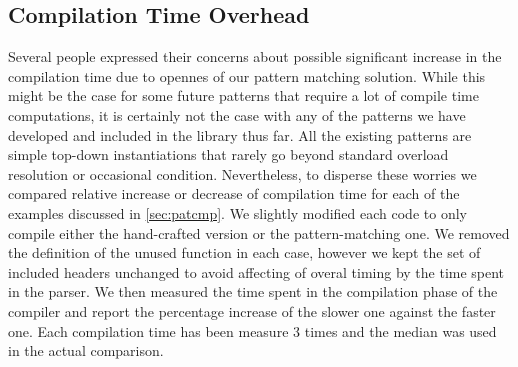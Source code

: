 \subsection{Compilation Time Overhead}
\label{sec:ctcmp}

Several people expressed their concerns about possible significant increase in 
the compilation time due to opennes of our pattern matching solution. While this 
might be the case for some future patterns that require a lot of compile time 
computations, it is certainly not the case with any of the patterns we have 
developed and included in the library thus far. All the existing patterns are 
simple top-down instantiations that rarely go beyond standard overload 
resolution or occasional  condition. Nevertheless, to 
disperse these worries we compared relative increase or decrease of compilation 
time for each of the examples discussed in \textsection\ref{sec:patcmp}. 
We slightly modified each code to only compile either the hand-crafted version 
or the pattern-matching one. We removed the definition of the unused function in 
each case, however we kept the set of included headers unchanged to avoid 
affecting of overal timing by the time spent in the parser. We then measured the 
time spent in the compilation phase of the compiler and report the percentage 
increase of the slower one against the faster one. Each compilation time has 
been measure 3 times and the median was used in the actual comparison.

